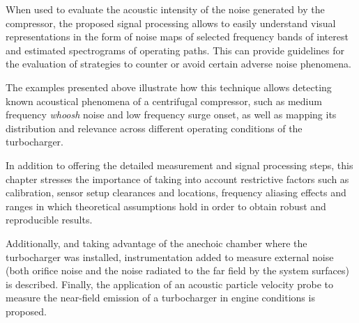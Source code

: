 When used to evaluate the acoustic intensity of the noise generated by the compressor, the proposed signal processing allows to easily  understand visual representations in the form of noise maps of selected frequency bands of interest and estimated spectrograms of operating paths. This can provide guidelines for the evaluation of strategies to counter or avoid certain adverse noise phenomena.

The examples presented above illustrate how this technique allows detecting known acoustical phenomena of a centrifugal compressor, such as medium frequency \emph{whoosh} noise and low frequency surge onset, as well as mapping its distribution and relevance across different operating conditions of the turbocharger.

In addition to offering the detailed measurement and signal processing steps, this chapter stresses the importance of taking into account restrictive factors such as calibration, sensor setup clearances and locations, frequency aliasing effects and ranges in which theoretical assumptions hold in order to obtain robust and reproducible results.

Additionally, and taking advantage of the anechoic chamber where the turbocharger was installed, instrumentation added to measure external noise (both orifice noise and the noise radiated to the far field by the system surfaces) is described. Finally, the application of an acoustic particle velocity probe to measure the near-field emission of a turbocharger in engine conditions is proposed.

